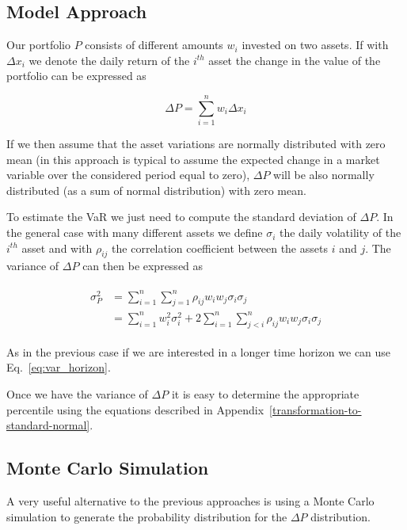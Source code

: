 \subsection{Model Approach}\label{model-approach}

Our portfolio \(P\) consists of different amounts \(w_i\)
invested on two assets. If with \(\Delta x_i\) we denote the daily
return of the $i^{th}$ asset the change in the value of the portfolio can be
expressed as

\begin{equation}\Delta P = \sum_{i=1}^n w_i \Delta x_i\end{equation}

If we then assume that the asset variations are normally distributed
with zero mean (in this approach is typical to assume the expected change
in a market variable over the considered period equal to zero), \(\Delta P\) will
be also normally distributed (as a sum of normal distribution) with zero
mean.

To estimate the VaR we just need to compute the standard deviation of
\(\Delta P\). In the general case with many different assets we define
\(\sigma_i\) the daily volatility of the $i^{th}$ asset and with
\(\rho_{ij}\) the correlation coefficient between the assets $i$ and $j$.
The variance of \(\Delta P\) can then be expressed as

\begin{align}
\begin{split}
\sigma^2_P & = \sum_{i=1}^{n}\sum_{j=1}^{n}\rho_{ij}w_i w_j \sigma_i \sigma_j \\
& = \sum_{i=1}^{n} w_i^2 \sigma_i^2 + 2 \sum_{i=1}^{n}\sum_{j<i}^{n}\rho_{ij}w_i w_j \sigma_i \sigma_j 
\end{split}
\end{align}

As in the previous case if we are interested in a longer time horizon we
can use Eq.~\ref{eq:var_horizon}.

Once we have the variance of \(\Delta P\) it is easy to determine the appropriate percentile using the equations described in Appendix~\ref{transformation-to-standard-normal}.

\subsection{Monte Carlo Simulation}\label{monte-carlo-simulation}

A very useful alternative to the previous approaches is using a Monte
Carlo simulation to generate the probability distribution for the
\(\Delta P\) distribution. 

